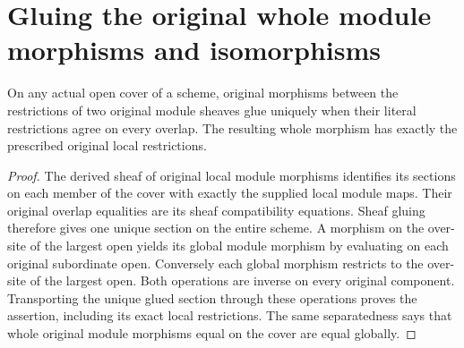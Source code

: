 \section{Gluing the original whole module morphisms and isomorphisms}

\begin{theorem}
\label{thm:scheme-original-module-morphism-gluing}
\leanok
On any actual open cover of a scheme, original morphisms between the
restrictions of two original module sheaves glue uniquely when their
literal restrictions agree on every overlap. The resulting whole
morphism has exactly the prescribed original local restrictions.
\end{theorem}
\begin{proof}
The derived sheaf of original local module morphisms identifies its
sections on each member of the cover with exactly the supplied local
module maps. Their original overlap equalities are its sheaf
compatibility equations. Sheaf gluing therefore gives one unique
section on the entire scheme. A morphism on the over-site of the
largest open yields its global module morphism by evaluating on each
original subordinate open. Conversely each global morphism restricts
to the over-site of the largest open. Both operations are inverse on
every original component. Transporting the unique glued section
through these operations proves the assertion, including its exact
local restrictions. The same separatedness says that whole original
module morphisms equal on the cover are equal globally.
\end{proof}

